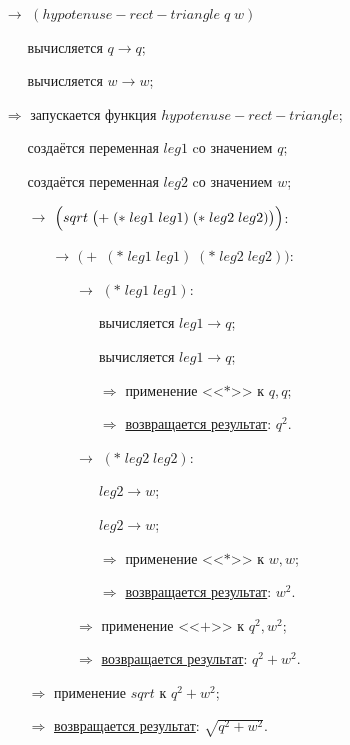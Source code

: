 \begin{itemize}
	\item[$\longrightarrow$] $(hypotenuse\!-\!rect\!-\!triangle\; q\; w)$
	\begin{itemize}
		\item[\textbullet] вычисляется $q \to q$;
		\item[\textbullet] вычисляется $w \to w$;
	\end{itemize}
	\item[$\Longrightarrow$] запускается функция $hypotenuse\!-\!rect\!-\!triangle$;
	\begin{itemize}
		\item[\textbullet] создаётся переменная $leg1$ cо значением $q$;
		\item[\textbullet] создаётся переменная $leg2$ cо значением $w$;
		\item[$\longrightarrow$] $\Bigl(sqrt\; \bigl(+\; (*\; leg1\; leg1)\; (*\; leg2\; leg2)\bigr)\Bigr)$:
		\begin{itemize}
			\item[$\longrightarrow$] $\bigl(+\; (*\; leg1\; leg1)\; (*\; leg2\; leg2)\bigr)$:
			\begin{enumerate}
				\item[$\longrightarrow$] $(*\; leg1\; leg1)$:
				\begin{enumerate}
					\item[\textbullet] вычисляется $leg1 \to q$;
					\item[\textbullet] вычисляется $leg1 \to q$;
					\item[$\Longrightarrow$] применение <<$*$>> к $q, q$;
					\item[$\Longrightarrow$] \underline{возвращается результат}: $q^2$.
				\end{enumerate}
				\item[$\longrightarrow$] $(*\; leg2\; leg2)$:
				\begin{enumerate}
					\item[\textbullet] $leg2 \to w$;
					\item[\textbullet] $leg2 \to w$;
					\item[$\Longrightarrow$] применение <<$*$>> к $w, w$;
					\item[$\Longrightarrow$] \underline{возвращается результат}: $w^2$.
				\end{enumerate}
				\item[$\Longrightarrow$] применение <<$+$>> к $q^2, w^2$;
				\item[$\Longrightarrow$] \underline{возвращается результат}: $q^2 + w^2$.
			\end{enumerate}
		\end{itemize}
		\item[$\Longrightarrow$] применение $sqrt$ к $q^2 + w^2$;
		\item[$\Longrightarrow$] \underline{возвращается результат}: $\sqrt{q^2 + w^2}$.
	\end{itemize}
\end{itemize}


